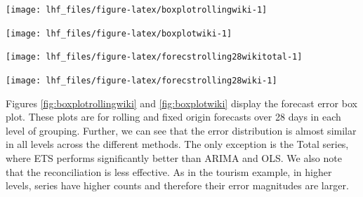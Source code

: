 \documentclass[11pt,a4paper,]{article}
\let\origfigure\figure
\let\endorigfigure\endfigure
\renewenvironment{figure}[1][2] {
    \expandafter\origfigure\expandafter[!htbp]
} {
    \endorigfigure
}
\begin{document}
\begin{figure}

{\centering \texttt{[image: lhf\_files/figure-latex/boxplotrollingwiki-1]} 

}

\caption{Box plots of forecast errors for reconciled and unreconciled ETS, ARIMA and OLS methods at each hierarchical level for rolling origin forecasts of Wikipedia pageviews.}\label{fig:boxplotrollingwiki}
\end{figure}

\begin{figure}

{\centering \texttt{[image: lhf\_files/figure-latex/boxplotwiki-1]} 

}

\caption{Box plots of forecast errors for reconciled and unreconciled ETS, ARIMA and OLS methods at each hierarchical level for fixed origin forecasts of Wikipedia pageviews.}\label{fig:boxplotwiki}
\end{figure}

\begin{figure}

{\centering \texttt{[image: lhf\_files/figure-latex/forecstrolling28wikitotal-1]} 

}

\caption{The actual test set for the 'Total' series compared to the forecasts from reconciled and unreconciled ETS, ARIMA and OLS methods for rolling and fixed origin forecasts of Wikipedia pageviews.}\label{fig:forecstrolling28wikitotal}
\end{figure}

\begin{figure}

{\centering \texttt{[image: lhf\_files/figure-latex/forecstrolling28wiki-1]} 

}

\caption{The actual test set for the 'desktopusenPho04' bottom level series compared to the forecasts from reconciled and unreconciled ETS, ARIMA and OLS methods for rolling and fixed origin forecasts of Wikipedia pageviews.}\label{fig:forecstrolling28wiki}
\end{figure}

Figures \ref{fig:boxplotrollingwiki} and \ref{fig:boxplotwiki} display the forecast error box plot. These plots are for rolling and fixed origin forecasts over 28 days in each level of grouping. Further, we can see that the error distribution is almost similar in all levels across the different methods. The only exception is the Total series, where ETS performs significantly better than ARIMA and OLS. We also note that the reconciliation is less effective. As in the tourism example, in higher levels, series have higher counts and therefore their error magnitudes are larger.
\end{document}
